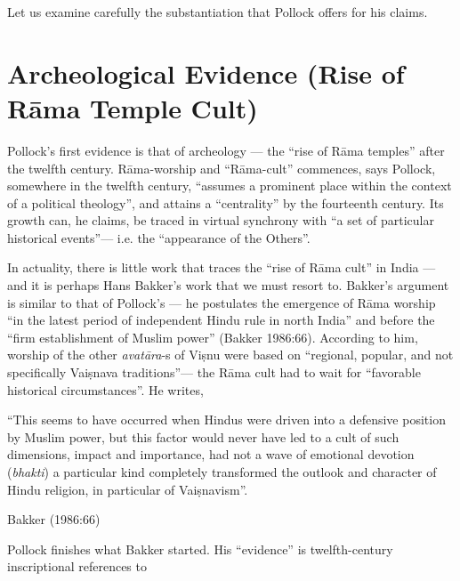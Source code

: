 Let us examine carefully the substantiation that Pollock offers for his claims.

\newpage

\section{Archeological Evidence (Rise of Rāma Temple Cult)}\label{sec3.1}

Pollock’s first evidence is that of archeology — the “rise of Rāma temples” after the twelfth century. Rāma-worship and “Rāma-cult” commences, says Pollock, somewhere in the twelfth century, “assumes a prominent place within the context of a political theology”, and attains a “centrality” by the fourteenth century. Its growth can, he claims, be traced in virtual synchrony with “a set of particular historical events”— i.e. the “appearance of the Others”. 

In actuality, there is little work that traces the “rise of Rāma cult” in India — and it is perhaps Hans Bakker’s work that we must resort to. Bakker’s argument is similar to that of Pollock’s — he postulates the emergence of Rāma worship “in the latest period of independent Hindu rule in north India” and before the “firm establishment of Muslim power” (Bakker 1986:66). According to him, worship of the other {\sl avatāra}-s of Viṣnu were based on “regional, popular, and not specifically Vaiṣnava traditions”— the Rāma cult had to wait for “favorable historical circumstances”. He writes,  

\begin{myquote}
“This seems to have occurred when Hindus were driven into a defensive position by Muslim power, but this factor would never have led to a cult of such dimensions, impact and importance, had not a wave of emotional devotion ({\sl bhakti}) a particular kind completely transformed the outlook and character of Hindu religion, in particular of Vaiṣnavism”.

\hfill Bakker (1986:66)
\end{myquote}

Pollock finishes what Bakker started. His “evidence” is twelfth-century inscriptional references to 


